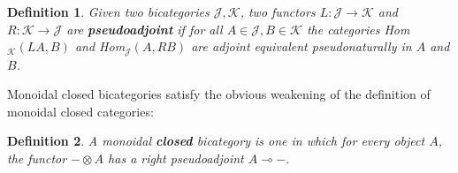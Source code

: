 \documentclass[12pt,twoside,openright]{report}
\newtheorem{defn}{Definition}
\newcommand{\maps}{\colon}
\newcommand{\lhom}{\multimap}
\newcommand{\tensor}{\otimes}
\begin{document}
\begin{defn}
  Given two bicategories $\mathcal{J}, \mathcal{K}$, two functors 
${L\maps\mathcal{J}\to \mathcal{K}}$ and ${R\maps\mathcal{K} \to \mathcal{J}}$ are
{\bf pseudoadjoint} if for all $A \in \mathcal{J}, B \in \mathcal{K}$
the categories Hom${}_\mathcal{K}(LA, B)$ and Hom${}_\mathcal{J}(A, RB)$
are adjoint equivalent pseudonaturally in $A$ and $B$.
\end{defn}

Monoidal closed bicategories satisfy the obvious weakening of the definition of monoidal closed categories:
\begin{defn}
  A monoidal {\bf closed} bicategory is one in which for every object
$A$, the functor $- \tensor A$ has a right pseudoadjoint $A \lhom -.$
\end{defn}
\end{document}
